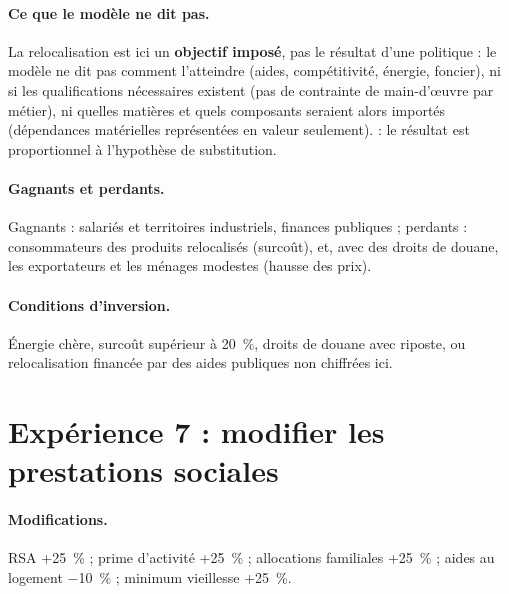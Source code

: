 \paragraph{Ce que le modèle ne dit pas.} La relocalisation est ici un \textbf{objectif imposé}, pas le résultat d'une
politique : le modèle ne dit pas comment l'atteindre (aides, compétitivité, énergie, foncier), ni si les qualifications
nécessaires existent (pas de contrainte de main-d'œuvre par métier), ni quelles matières et quels composants seraient
alors importés (dépendances matérielles représentées en valeur seulement).  : le résultat est
proportionnel à l'hypothèse de substitution.

\paragraph{Gagnants et perdants.} Gagnants : salariés et territoires industriels, finances publiques ; perdants :
consommateurs des produits relocalisés (surcoût), et, avec des droits de douane, les exportateurs et les ménages
modestes (hausse des prix).

\paragraph{Conditions d'inversion.} Énergie chère, surcoût supérieur à 20~\%, droits de douane avec riposte, ou
relocalisation financée par des aides publiques non chiffrées ici.

\section{Expérience 7 : modifier les prestations sociales}
\label{sec:exp7}

\paragraph{Modifications.} RSA +25~\% ; prime d'activité +25~\% ; allocations familiales +25~\% ; aides au logement
$-$10~\% ; minimum vieillesse +25~\%.

\begin{table}[htbp]
\centering\scriptsize
\caption{Expérience 7 — Prestations sociales.}
\label{tab:prestations}
\\[4pt]
\end{table}

